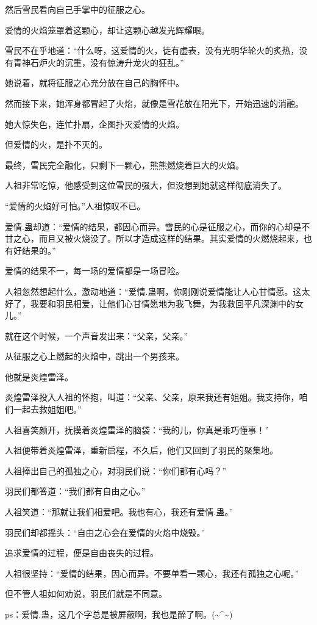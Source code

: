 \begin{this_body}
然后雪民看向自己手掌中的征服之心。

爱情的火焰笼罩着这颗心，却让这颗心越发光辉耀眼。

雪民不在乎地道：“什么呀，这爱情的火，徒有虚表，没有光明华轮火的炙热，没有青神石炉火的沉重，没有惊涛升龙火的狂乱。”

她说着，就将征服之心充分放在自己的胸怀中。

然而接下来，她浑身都冒起了火焰，就像是雪花放在阳光下，开始迅速的消融。

她大惊失色，连忙扑扇，企图扑灭爱情的火焰。

但爱情的火，是扑不灭的。

最终，雪民完全融化，只剩下一颗心，熊熊燃烧着巨大的火焰。

人祖非常吃惊，他感受到这位雪民的强大，但没想到她就这样彻底消失了。

“爱情的火焰好可怕。”人祖惊叹不已。

爱情.蛊却道：“爱情的结果，都因心而异。雪民的心是征服之心，而你的心却是不甘之心，而且又被火烧没了。所以才造成这样的结果。其实爱情的火燃烧起来，也有好结果的。”

爱情的结果不一，每一场的爱情都是一场冒险。

人祖忽然想起什么，激动地道：“爱情.蛊啊，你刚刚说爱情能让人心甘情愿。这太好了，我要和羽民相爱，让他们心甘情愿地为我飞舞，为我救回平凡深渊中的女儿。”

就在这个时候，一个声音发出来：“父亲，父亲。”

从征服之心上燃起的火焰中，跳出一个男孩来。

他就是炎煌雷泽。

炎煌雷泽投入人祖的怀抱，叫道：“父亲、父亲，原来我还有姐姐。我支持你，咱们一起去救姐姐吧。”

人祖喜笑颜开，抚摸着炎煌雷泽的脑袋：“我的儿，你真是乖巧懂事！”

人祖便带着炎煌雷泽，重新启程，不久后，他们又回到了羽民的聚集地。

人祖捧出自己的孤独之心，对羽民们说：“你们都有心吗？”

羽民们都答道：“我们都有自由之心。”

人祖笑道：“那就让我们相爱吧。我也有心，我还有爱情.蛊。”

羽民们却都摇头：“自由之心会在爱情的火焰中烧毁。”

追求爱情的过程，便是自由丧失的过程。

人祖很坚持：“爱情的结果，因心而异。不要单看一颗心，我还有孤独之心呢。”

但不管人祖如何劝说，羽民们就是不同意。

ps：爱情.蛊，这几个字总是被屏蔽啊，我也是醉了啊。(\~{}\^{}\~{})

\end{this_body}

